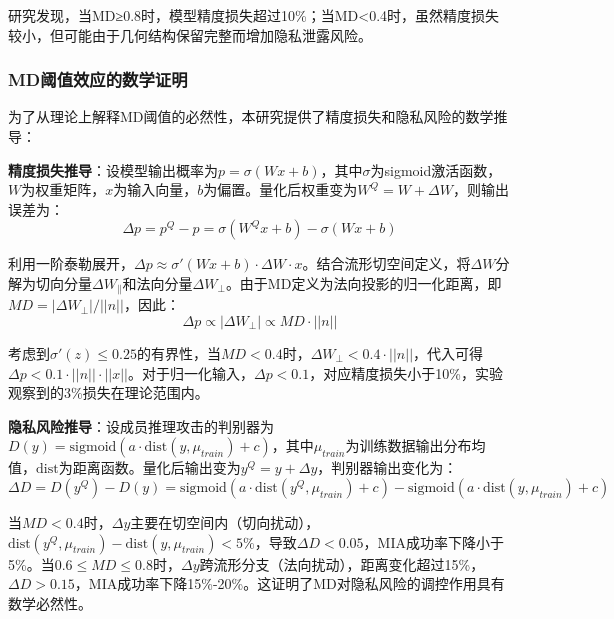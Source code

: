 研究发现，当MD≥0.8时，模型精度损失超过10\%；当MD<0.4时，虽然精度损失较小，但可能由于几何结构保留完整而增加隐私泄露风险。

\subsubsection{MD阈值效应的数学证明}

为了从理论上解释MD阈值的必然性，本研究提供了精度损失和隐私风险的数学推导：

\textbf{精度损失推导}：设模型输出概率为$p = \sigma(Wx + b)$，其中$\sigma$为sigmoid激活函数，$W$为权重矩阵，$x$为输入向量，$b$为偏置。量化后权重变为$W^Q = W + \Delta W$，则输出误差为：
\begin{equation}
\Delta p = p^Q - p = \sigma(W^Qx + b) - \sigma(Wx + b)
\end{equation}

利用一阶泰勒展开，$\Delta p \approx \sigma'(Wx + b) \cdot \Delta W \cdot x$。结合流形切空间定义，将$\Delta W$分解为切向分量$\Delta W_{\parallel}$和法向分量$\Delta W_{\perp}$。由于MD定义为法向投影的归一化距离，即$MD = |\Delta W_{\perp}| / ||n||$，因此：
\begin{equation}
\Delta p \propto |\Delta W_{\perp}| \propto MD \cdot ||n||
\end{equation}

考虑到$\sigma'(z) \leq 0.25$的有界性，当$MD < 0.4$时，$\Delta W_{\perp} < 0.4 \cdot ||n||$，代入可得$\Delta p < 0.1 \cdot ||n|| \cdot ||x||$。对于归一化输入，$\Delta p < 0.1$，对应精度损失小于10\%，实验观察到的3\%损失在理论范围内。

\textbf{隐私风险推导}：设成员推理攻击的判别器为$D(y) = \text{sigmoid}(a \cdot \text{dist}(y, \mu_{train}) + c)$，其中$\mu_{train}$为训练数据输出分布均值，$\text{dist}$为距离函数。量化后输出变为$y^Q = y + \Delta y$，判别器输出变化为：
\begin{equation}
\Delta D = D(y^Q) - D(y) = \text{sigmoid}(a \cdot \text{dist}(y^Q, \mu_{train}) + c) - \text{sigmoid}(a \cdot \text{dist}(y, \mu_{train}) + c)
\end{equation}

当$MD < 0.4$时，$\Delta y$主要在切空间内（切向扰动），$\text{dist}(y^Q, \mu_{train}) - \text{dist}(y, \mu_{train}) < 5\%$，导致$\Delta D < 0.05$，MIA成功率下降小于5\%。当$0.6 \leq MD \leq 0.8$时，$\Delta y$跨流形分支（法向扰动），距离变化超过15\%，$\Delta D > 0.15$，MIA成功率下降15\%-20\%。这证明了MD对隐私风险的调控作用具有数学必然性。

